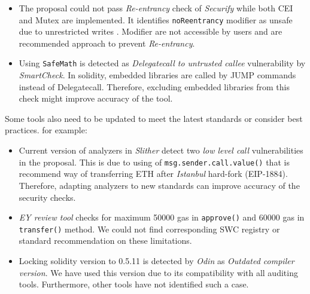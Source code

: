 \begin{itemize}[leftmargin=*]
	\item The proposal could not pass \textit{Re-entrancy} check of \textit{Securify} while both CEI and Mutex are implemented. It identifies \texttt{noReentrancy} modifier as unsafe due to unrestricted writes \cite{SECURIFY}. Modifier are not accessible by users and are recommended approach to prevent \textit{Re-entrancy}.
	\item Using \texttt{SafeMath} is detected as \textit{Delegatecall to untrusted callee} vulnerability by \textit{SmartCheck}. In solidity, embedded libraries are called by JUMP commands instead of Delegatecall. Therefore, excluding embedded libraries from this check might improve accuracy of the tool.
\end{itemize}
Some tools also need to be updated to meet the latest standards or consider best practices. for example:
\begin{itemize}[leftmargin=*]
	\item Current version of analyzers\cite{SlitherSetup} in \textit{Slither} detect two \textit{low level call} vulnerabilities in the proposal. This is due to using of \texttt{msg.sender.call.value()} that is recommend way of transferring ETH after \textit{Istanbul} hard-fork (EIP-1884).	Therefore, adapting analyzers to new standards can improve accuracy of the security checks.
	\item \textit{EY review tool} checks for maximum 50000 gas in \texttt{approve()} and 60000 gas in \texttt{transfer()} method. We could not find corresponding SWC registry or standard recommendation on these limitations.
	\item Locking solidity version to 0.5.11 is detected by \textit{Odin} as \textit{Outdated compiler version}. We have used this version due to its compatibility with all auditing tools. Furthermore, other tools have not identified such a case.
\end{itemize}
